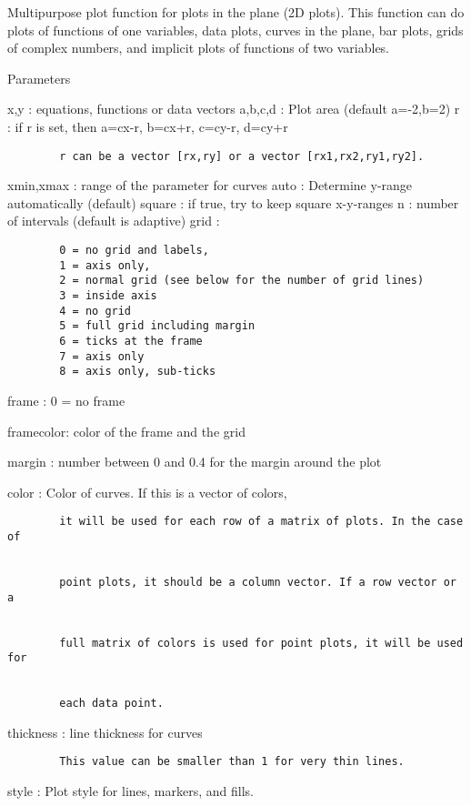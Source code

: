 \documentclass[
]{book}
\begin{document}
Multipurpose plot function for plots in the plane (2D plots). This function can do plots of functions of one variables, data plots, curves in the plane, bar plots, grids of complex numbers, and implicit plots of functions of two variables.

Parameters

x,y : equations, functions or data vectors a,b,c,d : Plot area (default a=-2,b=2) r : if r is set, then a=cx-r, b=cx+r, c=cy-r, d=cy+r

\begin{verbatim}
        r can be a vector [rx,ry] or a vector [rx1,rx2,ry1,ry2].
\end{verbatim}

xmin,xmax : range of the parameter for curves auto : Determine y-range automatically (default) square : if true, try to keep square x-y-ranges n : number of intervals (default is adaptive) grid :

\begin{verbatim}
        0 = no grid and labels,
        1 = axis only,
        2 = normal grid (see below for the number of grid lines)
        3 = inside axis
        4 = no grid
        5 = full grid including margin
        6 = ticks at the frame
        7 = axis only
        8 = axis only, sub-ticks
\end{verbatim}

frame : 0 = no frame

framecolor: color of the frame and the grid

margin : number between 0 and 0.4 for the margin around the plot

color : Color of curves. If this is a vector of colors,

\begin{verbatim}
        it will be used for each row of a matrix of plots. In the case of


        point plots, it should be a column vector. If a row vector or a


        full matrix of colors is used for point plots, it will be used for


        each data point.
\end{verbatim}

thickness : line thickness for curves

\begin{verbatim}
        This value can be smaller than 1 for very thin lines.
\end{verbatim}

style : Plot style for lines, markers, and fills.
\end{document}
